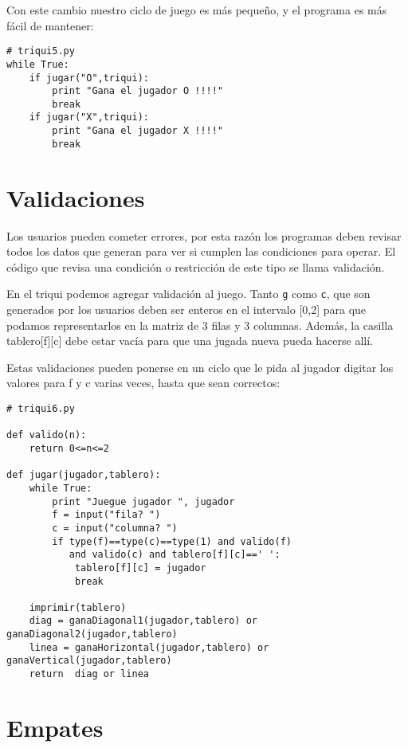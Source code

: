 Con este cambio nuestro ciclo de juego es más pequeño, y el programa es más
fácil de mantener:

\beforeverb
\begin{verbatim}
# triqui5.py
while True:
    if jugar("O",triqui):
        print "Gana el jugador O !!!!"
        break
    if jugar("X",triqui):
        print "Gana el jugador X !!!!"
        break
\end{verbatim}
\afterverb

\section{Validaciones}

Los usuarios pueden cometer errores, por esta razón los programas deben revisar
todos los datos que generan para ver si cumplen las condiciones
para operar. El código que revisa una condición 
o restricción de este tipo se llama validación.

En el triqui podemos agregar validación al juego. Tanto \texttt{g} como 
\texttt{c}, que son 
generados por los usuarios deben ser enteros en el intervalo [0,2] para 
que podamos representarlos en la matriz de 3 filas y 3 columnas. Además,
la casilla tablero[f][c] debe estar vacía para que
una jugada nueva pueda hacerse allí.  

Estas validaciones pueden ponerse en un ciclo que le pida al jugador
digitar los valores para f y c varias veces, hasta que sean correctos:

\beforeverb
\begin{verbatim}
# triqui6.py

def valido(n):
    return 0<=n<=2
    
def jugar(jugador,tablero):
    while True:     
        print "Juegue jugador ", jugador
        f = input("fila? ")
        c = input("columna? ")
        if type(f)==type(c)==type(1) and valido(f) 
           and valido(c) and tablero[f][c]==' ':
            tablero[f][c] = jugador
            break      

    imprimir(tablero)
    diag = ganaDiagonal1(jugador,tablero) or ganaDiagonal2(jugador,tablero)
    linea = ganaHorizontal(jugador,tablero) or ganaVertical(jugador,tablero)
    return  diag or linea

\end{verbatim}
\afterverb

\section{Empates}

